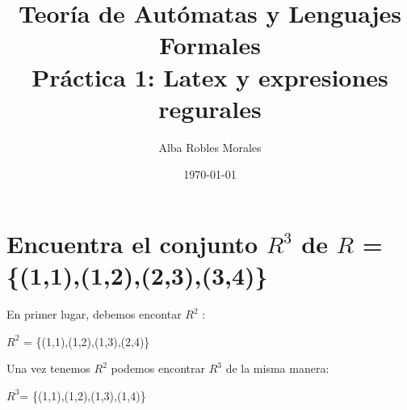 \documentclass[fleqn, 10pt]{article}
\title{Teoría de Autómatas y Lenguajes Formales\\[.4\baselineskip]Práctica 1: Latex y expresiones regurales}
\author{Alba Robles Morales}
\date{\today}
\theoremstyle{plain}
\theoremstyle{definition}
\begin{document}
\maketitle

\section{Encuentra el conjunto $R^3$ de $R$ =\{(1,1),(1,2),(2,3),(3,4)\} }

En primer lugar, debemos encontar $R^2$ :\\
\begin{center} 
$R^2$ = \{(1,1),(1,2),(1,3),(2,4)\}
\end{center}

Una vez tenemos $R^2$ podemos encontrar $R^3$ de la misma manera:\\
\begin{center} 
$R^3$= \{(1,1),(1,2),(1,3),(1,4)\}
\end {center}
\end{document}
